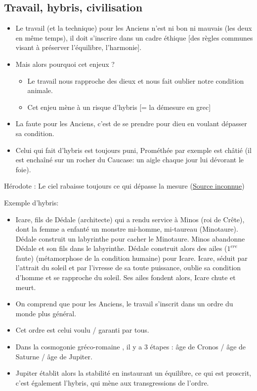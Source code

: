 \documentclass[a4paper, 11pt, hidelinks]{article}
\newcommand{\bs}{\bigskip}
\newcommand{\citer}[3]{\bs \begin{center} \textcolor{authorGray}{#1 :} \textcolor{citationRed}{\og #2 \fg} \textcolor{authorGray}{(\underline{#3})} \end{center} \bs}
\begin{document}



\subsection{Travail, hybris, civilisation}

\begin{itemize}
    \item Le travail (et la technique) pour les Anciens n'est ni bon ni mauvais (les deux en même temps), il doit s'inscrire dans un cadre éthique [des règles communes 
    visant à préserver l'équilibre, l'harmonie].
    \item Mais alors pourquoi cet enjeux ? 
        \begin{itemize}
            \item Le travail nous rapproche des dieux et nous fait oublier notre condition animale.
            \item Cet enjeu mène à un risque d'hybris [= la \og démesure \fg en grec]
        \end{itemize}
    \item La faute pour les Anciens, c'est de se prendre pour dieu en voulant dépasser sa condition.
    \item Celui qui fait d'hybris est toujours puni, Prométhée par exemple est châtié (il est enchaîné sur un rocher du Caucase: un aigle chaque jour
    lui dévorant le foie).
\end{itemize}

\citer{Hérodote}{Le ciel rabaisse toujours ce qui dépasse la mesure}{Source inconnue}

Exemple d'hybris:
\begin{itemize}
    \item Icare, fils de Dédale (architecte) qui a rendu service à Minos (roi de Crête), dont la femme a enfanté
    un monstre mi-homme, mi-taureau (Minotaure). Dédale construit un labyrinthe pour \og cacher \fg le Minotaure. Minos abandonne
    Dédale et son fils dans le labyrinthe. Dédale construit alors des ailes ($1^{ere}$ faute) (métamorphose de la condition humaine)
    pour Icare. Icare, séduit par l'attrait du soleil et par l'ivresse de sa toute puissance, oublie sa condition d'homme et se rapproche du soleil.
    Ses ailes fondent alors, Icare chute et meurt.
\end{itemize}

\bs

\begin{itemize}
    \item On comprend que pour les Anciens, le travail s'inscrit dans un \og ordre du monde \fg plus général.
    \item Cet ordre est celui voulu / garanti par tous. 
    \item Dans la cosmogonie \og gréco-romaine \fg, il y a 3 étapes : âge de Cronos / âge de Saturne / âge de Jupiter.
    \item Jupiter établit alors la stabilité en instaurant un équilibre, ce qui est proscrit, c'est également l'hybris, qui mène aux transgressions de l'ordre.
\end{itemize}
\end{document}
